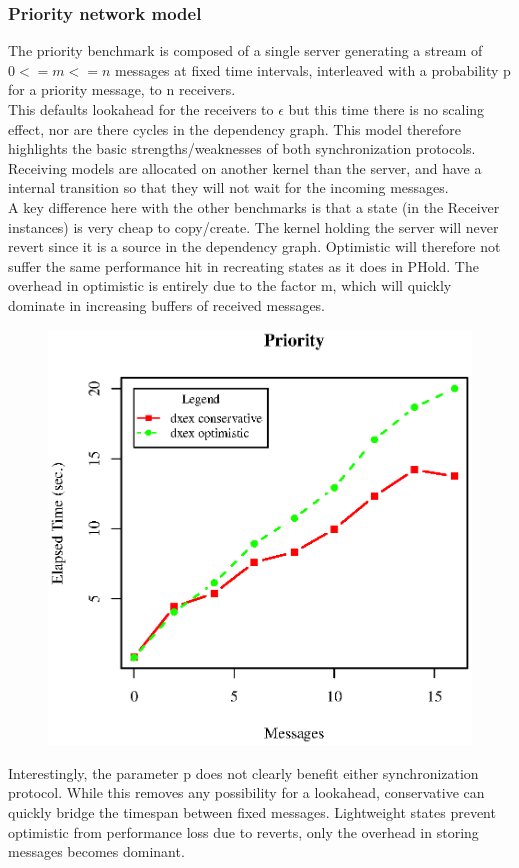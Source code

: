 \subsubsection{Priority network model}
The priority benchmark is composed of a single server generating a stream of $0<=m<=n$ messages at fixed time intervals, interleaved with a probability p for a priority message, to n receivers. \\ This defaults lookahead for the receivers to $\epsilon$ but this time there is no scaling effect, nor are there cycles in the dependency graph. This model therefore highlights the basic strengths/weaknesses of both synchronization protocols. Receiving models are allocated on another kernel than the server, and have a internal transition so that they will not wait for the incoming messages. 
 \\
A key difference here with the other benchmarks is that a state (in the Receiver instances) is very cheap to copy/create. The kernel holding the server will never revert since it is a source in the dependency graph. Optimistic will therefore not suffer the same performance hit in recreating states as it does in PHold. The overhead in optimistic is entirely due to the factor m, which will quickly dominate in increasing buffers of received messages.
\begin{figure}[ltbh]
	\includegraphics[width=.5\textwidth]{fig/fig5.eps}
	\label{fig5.eps}
\end{figure}
Interestingly, the parameter p does not clearly benefit either synchronization protocol. While this removes any possibility for a lookahead, conservative can quickly bridge the timespan between fixed messages. Lightweight states prevent optimistic from performance loss due to reverts, only the overhead in storing messages becomes dominant. 

